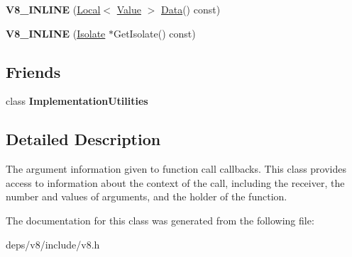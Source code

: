 \begin{DoxyCompactItemize}
\item 
\hypertarget{classv8_1_1_arguments_a1b64a7cf700bae4f89ebfe3fe4a28a2e}{}{\bfseries V8\+\_\+\+I\+N\+L\+I\+N\+E} (\hyperlink{classv8_1_1_local}{Local}$<$ \hyperlink{classv8_1_1_value}{Value} $>$ \hyperlink{classv8_1_1_data}{Data}() const)\label{classv8_1_1_arguments_a1b64a7cf700bae4f89ebfe3fe4a28a2e}

\item 
\hypertarget{classv8_1_1_arguments_a6b4870f856cb6d7a0a8500815b46298b}{}{\bfseries V8\+\_\+\+I\+N\+L\+I\+N\+E} (\hyperlink{classv8_1_1_isolate}{Isolate} $\ast$Get\+Isolate() const)\label{classv8_1_1_arguments_a6b4870f856cb6d7a0a8500815b46298b}

\end{DoxyCompactItemize}
\subsection*{Friends}
\begin{DoxyCompactItemize}
\item 
\hypertarget{classv8_1_1_arguments_ac7b520085953e146d849e05253267f72}{}class {\bfseries Implementation\+Utilities}\label{classv8_1_1_arguments_ac7b520085953e146d849e05253267f72}

\end{DoxyCompactItemize}


\subsection{Detailed Description}
The argument information given to function call callbacks. This class provides access to information about the context of the call, including the receiver, the number and values of arguments, and the holder of the function. 

The documentation for this class was generated from the following file\+:\begin{DoxyCompactItemize}
\item 
deps/v8/include/v8.\+h\end{DoxyCompactItemize}

